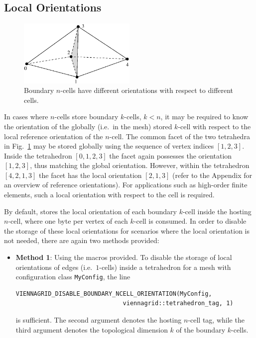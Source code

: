 \begin{itemize}
\subsection{Local Orientations} \label{subsec:customize-local-orientations}
\begin{figure}[tb]
\centering
 \includegraphics[width=0.5\textwidth]{figures/interface-tets.eps}
 \caption{Boundary $n$-cells have different orientations with respect to different cells.}
 \label{fig:orientation-boundary-ncells}
\end{figure}

In cases where $n$-cells store boundary $k$-cells, $k<n$, it may be required to know the orientation of the globally (i.e.~in the mesh) stored $k$-cell with respect to the local reference orientation of the $n$-cell. The common facet of the two tetrahedra in Fig.~\ref{fig:orientation-boundary-ncells} may be stored globally using the sequence of vertex indices $[1, 2, 3]$. Inside the tetrahedron $[0, 1, 2, 3]$ the facet again possesses the orientation $[1, 2, 3]$, thus matching the global orientation. However, within the tetrahedron $[4, 2, 1, 3]$ the facet has the local orientation $[2, 1, 3]$ (refer to the Appendix for an overview of reference orientations). For applications such as high-order finite elements, such a local orientation with respect to the cell is required.


By default, {\ViennaGrid} stores the local orientation of each boundary $k$-cell inside the hosting $n$-cell, where one byte per vertex of each $k$-cell is consumed. In order to disable the storage of these local orientations for scenarios where the local orientation is not needed, there are again two methods provided:
\begin{itemize}
 \item \textbf{Method 1}: Using the macros provided. To disable the storage of local orientations of edges (i.e.~$1$-cells) inside a tetrahedron for a mesh with configuration class \lstinline|MyConfig|, the line
\begin{lstlisting}
VIENNAGRID_DISABLE_BOUNDARY_NCELL_ORIENTATION(MyConfig,
                              viennagrid::tetrahedron_tag, 1)
\end{lstlisting}
is sufficient. The second argument denotes the hosting $n$-cell tag, while the third argument denotes the topological dimension $k$ of the boundary $k$-cells.


\end{itemize}
\end{itemize}
